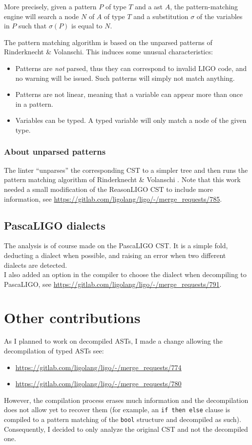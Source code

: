 \documentclass[10pt,a4paper]{article}
\begin{document}
More precisely, given a pattern $P$ of type $T$ and a ast $A$, the pattern-matching engine will search a node $N$ of $A$ of type $T$ and a substitution $\sigma$ of the variables in $P$ such that $\sigma(P)$ is equal to $N$.

The pattern matching algorithm is based on the unparsed patterns of Rinderknecht \& Volanschi\cite{unparsedpatterns}. This induces some unusual characteristics:

\begin{itemize}
\item Patterns are \emph{not} parsed, thus they can correspond to invalid LIGO code, and no warning will be issued. Such patterns will simply not match anything.
\item Patterns are not linear, meaning that a variable can appear more than once in a pattern.
\item Variables can be typed. A typed variable will only match a node of the given type.
\end{itemize}

\subsubsection{About unparsed patterns}
The linter ``unparses'' the corresponding CST to a simpler tree and then runs the pattern matching algorithm of Rinderknecht \& Volanschi \cite{unparsedpatterns}.
Note that this work needed a small modification of the ReasonLIGO CST to include more information, see \url{https://gitlab.com/ligolang/ligo/-/merge_requests/785}.

\subsection{PascaLIGO dialects}
The analysis is of course made on the PascaLIGO CST. It is a simple fold, deducting a dialect when possible, and raising an error when two different dialects are detected.\\
I also added an option in the compiler to choose the dialect when decompiling to PascaLIGO, see \url{https://gitlab.com/ligolang/ligo/-/merge_requests/791}.

\section{Other contributions}
As I planned to work on decompiled ASTs, I made a change allowing the decompilation of typed ASTs see:
\begin{itemize}
\item \url{https://gitlab.com/ligolang/ligo/-/merge_requests/774}
\item \url{https://gitlab.com/ligolang/ligo/-/merge_requests/780}
\end{itemize}
However, the compilation process erases much information and the decompilation does not allow yet to recover them (for example, an \verb|if then else| clause is compiled to a pattern matching of the \verb|bool| structure and decompiled as such). Consequently, I decided to only analyze the original CST and not the decompiled one.
\end{document}
